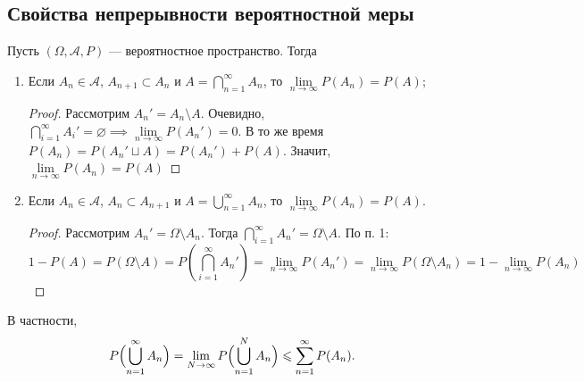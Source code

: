 \sectionbreak
\subsection{Свойства непрерывности вероятностной меры}

\begin{corollary*}
    Пусть $(\Omega, \mathcal{A}, P)$ --- вероятностное пространство.
    Тогда
    \begin{enumerate}
        \item Если $A_n \in \mathcal{A}$, $A_{n + 1} \subset A_n$ и $A = \bigcap\limits_{n = 1}^\infty A_n$, то $\lim\limits_{n \to \infty} P(A_n) = P(A)$;
        \begin{proof}
            Рассмотрим $A_n' = A_n \setminus A$. Очевидно, $\bigcap\limits_{i=1}^{\infty} A_i' = \varnothing \implies \lim\limits_{n \to \infty} P(A_n') = 0$. В то же время $P(A_n) = P(A_n' \sqcup A) = P(A_n') + P(A)$. Значит, $\lim\limits_{n \to \infty} P(A_n) = P(A)$
        \end{proof}
        \item Если $A_n \in \mathcal{A}$, $A_n \subset A_{n + 1}$ и $A = \bigcup\limits_{n = 1}^\infty A_n$, то $\lim\limits_{n \to \infty} P(A_n) = P(A)$.
        \begin{proof}
            Рассмотрим $A_n' = \Omega \setminus A_n$. Тогда $\bigcap\limits_{i=1}^{\infty} A_n' = \Omega \setminus A$. По п. 1:
            \[
                1 - P(A) = P(\Omega \setminus A) = P\left(\bigcap\limits_{i=1}^{\infty} A_n'\right) = \lim\limits_{n \to \infty} P(A_n') = \lim\limits_{n \to \infty}P(\Omega \setminus A_n) = 1 - \lim\limits_{n \to \infty}P(A_n)
            \]
        \end{proof}
    \end{enumerate}
\end{corollary*}

В частности,
\[
    P \Bigl(\bigcup\limits_{n = 1}^\infty A_n\Bigr) = \lim\limits_{N \to \infty} P\Bigl(\bigcup\limits_{n = 1}^N A_n\Bigr) \leqslant \sum\limits_{n = 1}^{\infty} P(A_n).
\]